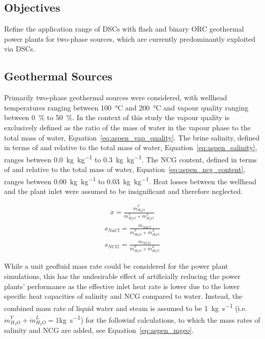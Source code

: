 \subsection{Objectives}

    Refine the application range of \ac{DSC}s with flash and binary \ac{ORC} geothermal power plants for two-phase sources, which are currently predominantly exploited via \ac{DSC}s.

\subsection{Geothermal Sources}

    Primarily two-phase geothermal sources were considered, with wellhead temperatures ranging between \qty{100}{\degreeCelsius} and \qty{200}{\degreeCelsius} and vapour quality ranging between \qty{0}{\percent} to \qty{50}{\percent}. In the context of this study the vapour quality is exclusively defined as the ratio of the mass of water in the vapour phase to the total mass of water, Equation~\ref{eq:aspen_vap_quality}. The brine salinity, defined in terms of  and relative to the total mass of water, Equation~\ref{eq:aspen_salinity}, ranges between \qty{0.0}{\kg\per\kg} to \qty{0.3}{\kg\per\kg}. The \ac{NCG} content, defined in terms of  and relative to the total mass of water, Equation~\ref{eq:aspen_ncg_content}, ranges between \qty{0.00}{\kg\per\kg} to \qty{0.03}{\kg\per\kg}. Heat losses between the wellhead and the plant inlet were assumed to be insignificant and therefore neglected.

    \begin{align}
        x = \frac{\Dot{m}_{H_2O}^V}{\Dot{m}_{H_2O}^V+\Dot{m}_{H_2O}^L} \label{eq:aspen_vap_quality}
    \end{align}
    \begin{align}
        s_{NaCl} = \frac{\Dot{m}_{NaCl}}{\Dot{m}_{H_2O}^V+\Dot{m}_{H_2O}^L} \label{eq:aspen_salinity}
    \end{align}
    \begin{align}
        s_{NCG} = \frac{\Dot{m}_{NCG}}{\Dot{m}_{H_2O}^V+\Dot{m}_{H_2O}^L} \label{eq:aspen_ncg_content}
    \end{align}

    While a unit geofluid mass rate could be considered for the power plant simulations, this has the undesirable effect of artificially reducing the power plants’ performance as the effective inlet heat rate is lower due to the lower specific heat capacities of salinity and \ac{NCG} compared to water. Instead, the combined mass rate of liquid water and steam is assumed to be \qty{1}{\kg\per\s} (i.e. \(\Dot{m}_{H_2O}^V+\Dot{m}_{H_2O}^L=1\)\unit{\kg\per\s}) for the followinf calculations, to which the mass rates of salinity and \ac{NCG} are added, see Equation~\ref{eq:aspen_mgeo}.

